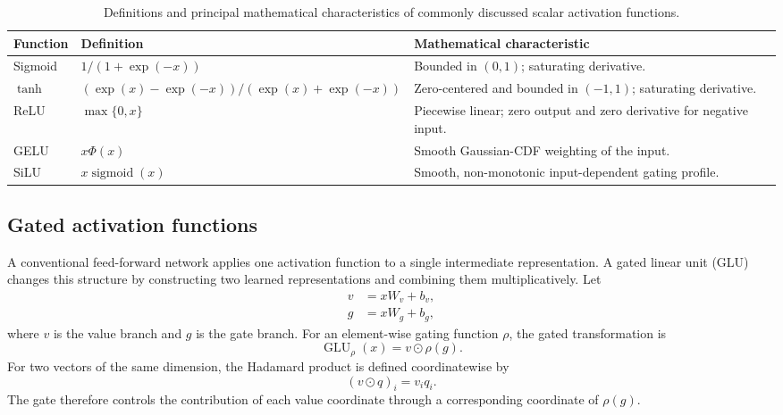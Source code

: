 \begin{table}[htbp]
    \centering
    \caption{Definitions and principal mathematical characteristics of
    commonly discussed scalar activation functions.}
    \label{tab:act-scalar-functions}
    \small
    \begin{tabularx}{\textwidth}{l X X}
        \toprule
        Function & Definition & Mathematical characteristic \\
        \midrule
        Sigmoid
        & \(1/(1+\exp(-x))\)
        & Bounded in \((0,1)\); saturating derivative. \\
        \(\tanh\)
        & \((\exp(x)-\exp(-x))/(\exp(x)+\exp(-x))\)
        & Zero-centered and bounded in \((-1,1)\); saturating derivative. \\
        ReLU
        & \(\max\{0,x\}\)
        & Piecewise linear; zero output and zero derivative for negative input. \\
        GELU
        & \(x\Phi(x)\)
        & Smooth Gaussian-CDF weighting of the input. \\
        SiLU
        & \(x\operatorname{sigmoid}(x)\)
        & Smooth, non-monotonic input-dependent gating profile. \\
        \bottomrule
    \end{tabularx}
    \normalsize
\end{table}

\subsection{Gated activation functions}
\label{subsec:act-gated}

A conventional feed-forward network applies one activation function to a
single intermediate representation. A gated linear unit (GLU) changes
this structure by constructing two learned representations and combining
them multiplicatively. Let
\begin{align}
    v &= xW_v+b_v,
    \label{eq:act-glu-value}\\
    g &= xW_g+b_g,
    \label{eq:act-glu-gate}
\end{align}
where \(v\) is the value branch and \(g\) is the gate branch. For an
element-wise gating function \(\rho\), the gated transformation is
\begin{equation}
    \operatorname{GLU}_{\rho}(x)
    =
    v\odot\rho(g).
    \label{eq:act-glu-general}
\end{equation}
For two vectors of the same dimension, the Hadamard product is defined
coordinatewise by
\begin{equation}
    (v\odot q)_i=v_iq_i.
    \label{eq:act-hadamard}
\end{equation}
The gate therefore controls the contribution of each value coordinate
through a corresponding coordinate of \(\rho(g)\).

